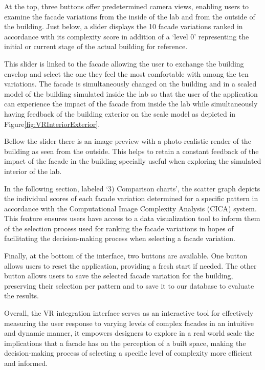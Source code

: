 At the top, three buttons offer predetermined camera views, enabling users to examine the facade variations from the inside of the lab and from the outside of the building.
Just below, a slider displays the 10 facade variations ranked in accordance with its complexity score in addition of a `level 0' representing the initial or current stage of the actual building for reference.

This slider is linked to the facade allowing the user to exchange the building envelop and select the one they feel the most comfortable with among the ten variations.
The facade is simultaneously changed on the building and in a scaled model of the building simulated inside the lab so that the user of the application can experience the impact of the facade from inside the lab while simultaneously having feedback of the building exterior on the scale model as depicted in Figure\ref{fig:VRInteriorExterior}.

Bellow the slider there is an image preview with a photo-realistic render of the building as seen from the outside.
This helps to retain a constant feedback of the impact of the facade in the building specially useful when exploring the simulated interior of the lab.

In the following section, labeled `3) Comparison charts', the scatter graph depicts the individual scores of each facade variation determined for a specific pattern in accordance with the Computational Image Complexity Analysis (CICA) system.
This feature ensures users have access to  a data visualization tool to inform them of the selection process used for ranking the facade variations in hopes of facilitating the decision-making process when selecting a facade variation.

Finally, at the bottom of the interface, two buttons are available.
One button allows users to reset the application, providing a fresh start if needed.
The other button allows users to save the selected facade variation for the building, preserving their selection per pattern and to save it to our database to evaluate the results.

Overall, the VR integration interface serves as an interactive tool for effectively measuring the user response to varying levels of complex facades in an intuitive and dynamic manner, it empowers designers to explore in a real world scale the implications that a facade has on the perception of a built space, making the decision-making process of selecting a specific level of complexity more efficient and informed.






